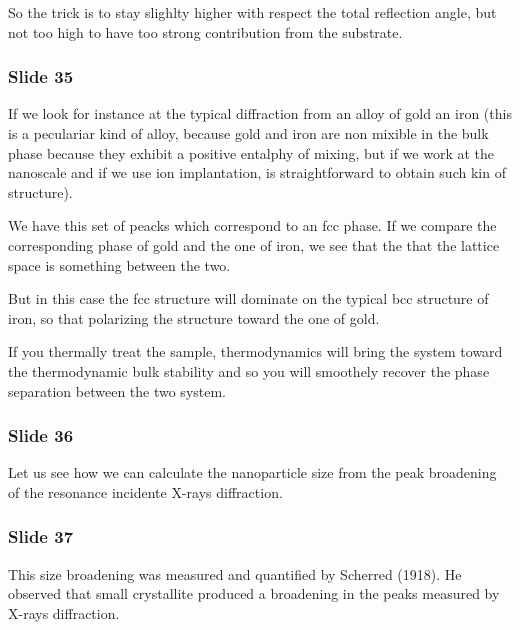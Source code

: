 \documentclass[../main/main.tex]{subfiles}
\begin{document}
So the trick is to stay slighlty higher with respect the total reflection angle, but not too high to have too strong contribution from the substrate.


\subsubsection{Slide 35}
If we look for instance at the typical diffraction from an alloy of gold an iron (this is a peculariar kind of alloy, because gold and iron are non mixible in the bulk phase because they exhibit a positive entalphy of mixing, but if we work at the nanoscale and if we use ion implantation, is straightforward to obtain such kin of structure).

We have this set of peacks which correspond to an fcc phase. If we compare the corresponding phase of gold and the one of iron, we see that the that the lattice space is something between the two.

But in this case the fcc structure will dominate on the typical bcc structure of iron, so that polarizing the structure toward the one of gold.

If you thermally treat the sample, thermodynamics will bring the system toward the thermodynamic bulk stability and so you will smoothely recover the phase separation between the two system.


\subsubsection{Slide 36}
Let us see how we can calculate the nanoparticle size from the peak broadening of the resonance incidente X-rays diffraction.


\subsubsection{Slide 37}
This size broadening was measured and quantified by Scherred (1918). He observed that small crystallite produced a broadening in the peaks measured by X-rays diffraction.
\end{document}
